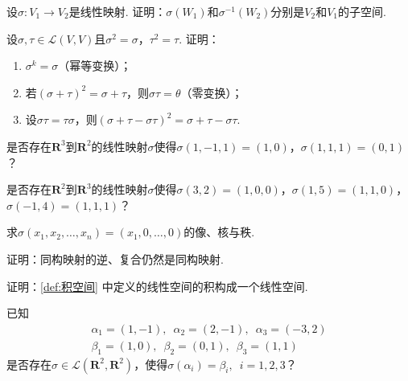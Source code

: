 \begin{exercise}

    \begin{exgroup}
        \item 设$\sigma: V_1\to V_2$是线性映射. 证明：$\sigma(W_1)$和$\sigma^{-1}(W_2)$分别是$V_2$和$V_1$的子空间.

        \item 设$\sigma,\tau \in \mathcal{L}(V,V)$且$\sigma^2=\sigma$，$\tau^2=\tau$. 证明：
        \begin{enumerate}
            \item $\sigma^k=\sigma$（幂等变换）；

            \item 若$(\sigma+\tau)^2=\sigma+\tau$，则$\sigma\tau=\theta$（零变换）；

            \item 设$\sigma\tau=\tau\sigma$，则$(\sigma+\tau-\sigma\tau)^2=\sigma+\tau-\sigma\tau$.
        \end{enumerate}

        \item 是否存在$\mathbf{R}^3$到$\mathbf{R}^2$的线性映射$\sigma$使得$\sigma(1,-1,1)=(1,0)$，$\sigma(1,1,1)=(0,1)$？

        \item 是否存在$\mathbf{R}^2$到$\mathbf{R}^3$的线性映射$\sigma$使得$\sigma(3,2)=(1,0,0)$，$\sigma(1,5)=(1,1,0)$，$\sigma(-1,4)=(1,1,1)$？

        \item 求$\sigma(x_1,x_2,\ldots,x_n)=(x_1,0,\ldots,0)$的像、核与秩.

        \item 证明：同构映射的逆、复合仍然是同构映射.

        \item 证明：\autoref{def:积空间} 中定义的线性空间的积构成一个线性空间.
    \end{exgroup}

    \begin{exgroup}
        \item 已知
        \begin{gather*}
            \alpha_1=(1,-1),\enspace\alpha_2=(2,-1),\enspace\alpha_3=(-3,2) \\
            \beta_1=(1,0),\enspace\beta_2=(0,1),\enspace\beta_3=(1,1)
        \end{gather*}
        是否存在$\sigma\in \mathcal{L}(\mathbf{R}^2,\mathbf{R}^2)$，使得$\sigma(\alpha_i)=\beta_i,\enspace i=1,2,3$？


\end{exgroup}
\end{exercise}
